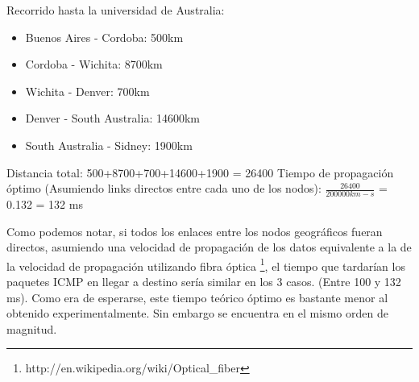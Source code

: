 Recorrido hasta la universidad de Australia:

\begin{itemize}
	\item Buenos Aires - Cordoba: 500km
	\item Cordoba - Wichita: 8700km
	\item Wichita - Denver: 700km
	\item Denver - South Australia: 14600km
	\item South Australia - Sidney:  1900km
\end{itemize}

Distancia total: 500+8700+700+14600+1900 = 26400
Tiempo de propagación óptimo (Asumiendo links directos entre cada uno de los nodos):
$\frac{26400}{200000km-s}$ = 0.132 = 132 ms

Como podemos notar, si todos los enlaces entre los nodos geográficos fueran directos,
asumiendo una velocidad de propagación de los datos equivalente a la de la velocidad
de propagación utilizando fibra óptica \footnote{http://en.wikipedia.org/wiki/Optical\_fiber}, el tiempo que tardarían los paquetes ICMP en llegar a destino sería similar en los 3 casos. (Entre 100 y 132 ms). Como era de esperarse, este tiempo teórico óptimo es bastante menor al obtenido experimentalmente. Sin embargo se encuentra en el mismo orden de magnitud.


















